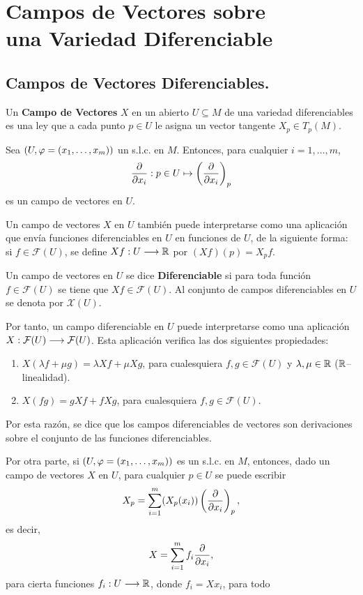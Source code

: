 \documentclass[cursovd_portada.tex]{subfiles}
\begin{document}
\chapter{Campos de Vectores sobre\\ una Variedad Diferenciable}
\section{Campos de Vectores Diferenciables.}
\begin{defi}
Un {\bf Campo de Vectores} $X$ en un abierto $U\subseteq M$ de una variedad diferenciables es una ley que a cada
punto $p\in U$ le asigna un vector tangente $X_p\in T_p(M)$.
\end{defi}
\begin{ej}
{\rm Sea $(U,\varphi=(x_1,\dots ,x_m))$ un s.l.c. en $M$. Entonces, para cualquier $i=1,\dots ,m$,
$$\displaystyle{\frac{\partial}{\partial x_i}}:p\in U\mapsto\left(\displaystyle{\frac{\partial}{\partial x_i}}\right)_p$$
es un campo de vectores en $U$.}
\end{ej}
Un campo de vectores $X$ en $U$ también puede interpretarse como una aplicación que envía funciones diferenciables
en $U$ en funciones de $U$, de la siguiente forma: si $f\in\mathcal{F}(U)$, se define $Xf:U\longrightarrow\mathbb{R}$ por
$(Xf)(p)=X_pf$.
\begin{defi}
Un campo de vectores en $U$ se dice {\bf Diferenciable} si para toda función $f\in\mathcal{F}(U)$ se tiene que
$Xf\in\mathcal{F}(U)$. Al conjunto de campos diferenciables en $U$ se denota por $\mathcal{X}(U)$.
\end{defi}
Por tanto, un campo diferenciable en $U$ puede interpretarse como una aplicación
$X:\mathcal{F}(U)\longrightarrow\mathcal{F}(U)$. Esta aplicación verifica las dos siguientes propiedades:
\begin{enumerate}
\item $X(\lambda f+\mu g)=\lambda Xf+\mu Xg$, para cualesquiera $f,g\in\mathcal{F}(U)$ y $\lambda,\mu\in\mathbb{R}$
($\mathbb{R}$--linealidad).
\item $X(fg)=gXf+fXg$, para cualesquiera $f,g\in\mathcal{F}(U)$.
\end{enumerate}
\hs Por esta razón, se dice que los campos diferenciables de vectores son derivaciones sobre el conjunto de las
funciones diferenciables.
\par
Por otra parte, si $(U,\varphi=(x_1,\dots ,x_m))$ es un s.l.c. en $M$, entonces, dado un campo de vectores $X$ en $U$,
para cualquier $p\in U$ se puede escribir
$$X_p=\sum_{i=1}^m(X_p(x_i))\left(\displaystyle{\frac{\partial}{\partial x_i}}\right)_p,$$
es decir,
$$X=\sum_{i=1}^mf_i\displaystyle{\frac{\partial}{\partial x_i}},$$
para cierta funciones $f_i:U\longrightarrow\mathbb{R}$, donde $f_i=Xx_i$, para todo
\end{document}

